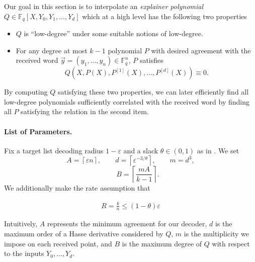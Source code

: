 \documentclass[11pt]{article}
\newcommand{\F}{\mathbb F}
\newcommand{\eps}{\varepsilon}
\begin{document}
Our goal in this section is to interpolate an \emph{explainer polynomial} $Q\in \mathbb F_q[X,Y_0,Y_1,\ldots,Y_d]$ which at a high level has the following two properties
\begin{itemize}
    \item $Q$ is ``low-degree'' under some suitable notions of low-degree.
    \item For any degree at most $k-1$ polynomial $P$ with desired agreement with the received word $\vec{y}=(y_1,\dots,y_n)\in\F_q^n$, $P$ satisfies
    \[
    Q(X, P(X), P^{[1]}(X), \ldots, P^{[d]}(X)) \equiv 0 .
    \]
\end{itemize}
By computing $Q$ satisfying these two properties, we can later efficiently find all low-degree polynomials sufficiently correlated with the received word by finding all $P$ satisfying the relation in the second item. 

\paragraph{List of Parameters.}
Fix a target list decoding radius $1-\eps$ and a slack $\theta \in (0,1)$ as in . We set 
\begin{equation} \label{eq:global_params}
A = \left\lceil
\eps n
\right\rceil, \qquad
d=\left\lceil \eps^{-3/\theta} \right \rceil,
\qquad
m=d^3,
\end{equation}
\begin{equation}\label{eq:s-and-B}
\qquad
B=\left\lceil\frac{mA}{k-1}\right\rceil.
\end{equation}
We additionally make the rate assumption that

\begin{align}
    R = \frac{k}{n} \le (1-\theta)\eps\label{eq:rate-bound}
\end{align}

Intuitively, $A$ represents the minimum agreement for our decoder, $d$ is the maximum order of a Hasse derivative considered by $Q$, $m$ is the multiplicity we impose on each received point, and $B$ is the maximum degree of $Q$ with respect to the inputs $Y_0, \hdots, Y_d$.
\end{document}
